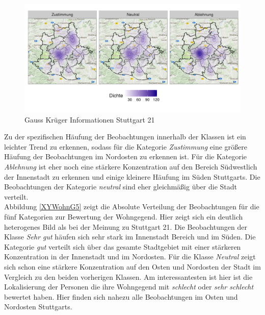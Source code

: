 \documentclass{Vorlage}
\begin{document}
\begin{figure}[h]
 \begin{center}
 \includegraphics[scale=0.8]{Pictures/XYStuttgart3}
 \caption{Gauss Krüger Informationen Stuttgart 21}
 \label{XYStuttgart3}
 \end{center}
\end{figure}

Zu der spezifischen Häufung der Beobachtungen innerhalb der Klassen ist ein leichter Trend zu erkennen, sodass für die Kategorie \textit{Zustimmung} eine größere Häufung der Beobachtungen im Nordosten zu erkennen ist. Für die Kategorie \textit{Ablehnung} ist eher noch eine stärkere Konzentration auf den Bereich Südwestlich der Innenstadt zu erkennen und einige kleinere Häufung im Süden Stuttgarts. Die Beobachtungen der Kategorie \textit{neutral} sind eher gleichmäßig über die Stadt verteilt.\\
Abbildung \ref{XYWohnG5} zeigt die Absolute Verteilung der Beobachtungen für die fünf Kategorien zur Bewertung der Wohngegend. Hier zeigt sich ein deutlich heterogenes Bild als bei der Meinung zu Stuttgart 21. Die Beobachtungen der Klasse \textit{Sehr gut} häufen sich sehr stark im Innenstadt Bereich und im Süden. Die Kategorie \textit{gut} verteilt sich über das gesamte Stadtgebiet mit einer stärkeren Konzentration in der Innenstadt und im Nordosten. Für die Klasse \textit{Neutral} zeigt sich schon eine stärkere Konzentration auf den Osten und Nordosten der Stadt im Vergleich zu den beiden vorherigen Klassen. Am interessantesten ist hier ist die Lokalisierung der Personen die ihre Wohngegend mit \textit{schlecht} oder \textit{sehr schlecht} bewertet haben. Hier finden sich nahezu alle Beobachtungen im Osten und Nordosten Stuttgarts.
\end{document}
